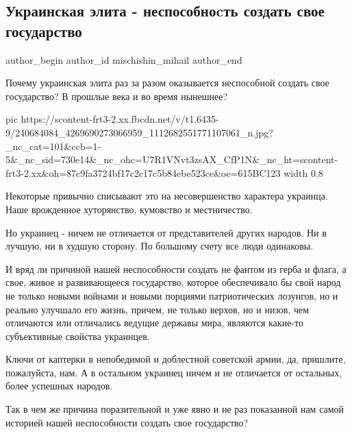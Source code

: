  
 
 
 
 
 
\subsection{Украинская элита - неспособноcть создать свое государство}
\label{sec:29_08_2021.fb.mischishin_mihail.1.elita_ukr_gosudarstvo}
 
\ifcmt
 author_begin
   author_id mischishin_mihail
 author_end
\fi

Почему украинская элита раз за разом оказывается неспособной создать свое
государство? В прошлые века и во время нынешнее?

\ifcmt
  pic https://scontent-frt3-2.xx.fbcdn.net/v/t1.6435-9/240684084_4269690273066959_1112682551771107061_n.jpg?_nc_cat=101&ccb=1-5&_nc_sid=730e14&_nc_ohc=U7R1VNvt3zsAX_CfP1N&_nc_ht=scontent-frt3-2.xx&oh=87c9fa3724bf17c2c17c5b84ebe523ce&oe=615BC123
  width 0.8
\fi

Некоторые привычно списывают это на несовершенство характера украинца. Наше
врожденное хуторянство, кумовство и местничество.

Но украинец - ничем не отличается от представителей других народов. Ни в
лучшую, ни в худшую сторону. По большому счету все люди одинаковы.

И вряд ли причиной нашей неспособности создать не фантом из герба и флага, а
свое, живое и развивающееся государство, которое обеспечивало бы свой народ не
только новыми войнами и новыми порциями патриотических лозунгов, но и реально
улучшало его жизнь, причем, не только верхов, но и низов, чем отличаются или
отличались ведущие державы мира, являются какие-то субъективные свойства
украинцев.

Ключи от каптерки в непобедимой и доблестной советской армии, да, пришлите,
пожалуйста, нам. А в остальном украинец ничем и не отличается от остальных,
более успешных народов.

Так в чем же причина поразительной и уже явно и не раз показанной нам самой
историей нашей неспособности создать свое государство?

